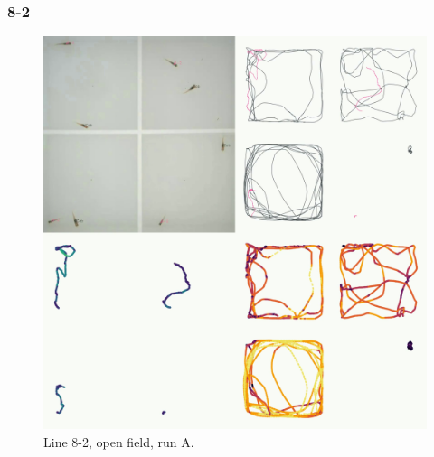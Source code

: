 \documentclass[
]{book}
\begin{document}
\hypertarget{section}{%
\subsubsection{8-2}\label{section}}



\begin{figure}
\includegraphics[width=1\linewidth]{figs/mikk_behaviour/four_panel_plots/open_field_20191114_1040_8-2_L_A_300} \caption{Line 8-2, open field, run A.}\label{fig:4p-8-2-of-A}
\end{figure}
\end{document}
